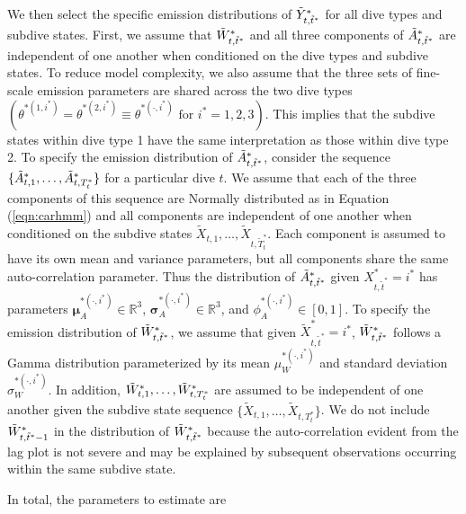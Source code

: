 We then select the specific emission distributions of $\tilde{Y}^*_{t,\tilde t^*}$ for all dive types and subdive states. First, we assume that $\tilde{W}^*_{t,\tilde t^*}$ and all three components of $\tilde{A}^*_{t,\tilde t^*}$ are independent of one another when conditioned on the dive types and subdive states. To reduce model complexity, we also assume that the three sets of fine-scale emission parameters are shared across the two dive types $\left(\theta^{*(1,i^*)} = \theta^{*(2,i^*)} \equiv \theta^{*(\cdot,i^*)} \text{ for } i^* = 1,2,3\right)$. This implies that the subdive states within dive type 1 have the same interpretation as those within dive type 2.
To specify the emission distribution of $\tilde{A}^*_{t,\tilde t^*}$, consider the sequence $\{\tilde{A}^*_{t,1},\ldots,\tilde{A}^*_{t,T^*_t}\}$ for a particular dive $t$. We assume that each of the three components of this sequence are Normally distributed as in Equation (\ref{eqn:carhmm}) and all components are independent of one another when conditioned on the subdive states $\tilde X_{t,1},\ldots,\tilde X_{t,\tilde T^*_t}$. Each component is assumed to have its own mean and variance parameters, but all components share the same auto-correlation parameter. Thus the distribution of $\tilde{A}^*_{t,\tilde t^*}$ given $X^*_{t,\tilde t^*} = i^*$ has parameters $\mathbf{\mu}_A^{*(\cdot,i^*)} \in \mathbb{R}^3$, $\mathbf{\sigma}_A^{*(\cdot,i^*)} \in \mathbb{R}^3$, and $\phi_A^{*(\cdot,i^*)} \in [0,1]$.
To specify the emission distribution of $\tilde{W}^*_{t,\tilde t^*}$, we assume that given $\tilde X^*_{t,\tilde t^*} = i^*$, $\tilde{W}^*_{t,\tilde t^*}$ follows a Gamma distribution parameterized by its mean $\mu_W^{*(\cdot,i^*)}$ and standard deviation $\sigma_W^{*(\cdot,i^*)}$. In addition, $\tilde{W}^*_{t,1},\ldots,\tilde{W}^*_{t,T^*_t}$ are assumed to be independent of one another given the subdive state sequence $\big\{\tilde X_{t,1}, \ldots, \tilde X_{t,T_t^*}\big\}$. We do not include $\tilde{W}^*_{t,\tilde t^*-1}$ in the distribution of $\tilde{W}^*_{t,\tilde t^*}$ because the auto-correlation evident from the lag plot is not severe and may be explained by subsequent observations occurring within the same subdive state. 

In total, the parameters to estimate are


